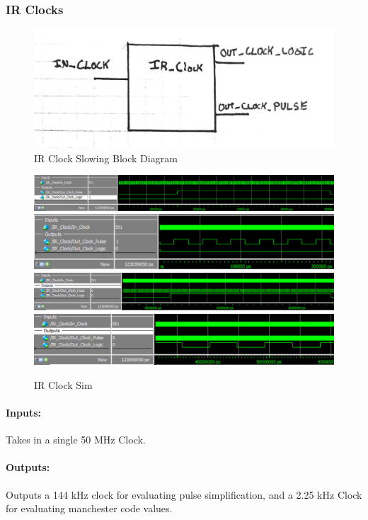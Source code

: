 \documentclass[]{article}
\begin{document}
\subsubsection{IR Clocks}
\label{irclocks}
\begin{figure}[H]\centering
    \includegraphics[width=0.9\linewidth]{figures/IR_Clock_Block.jpg}
    \caption{IR Clock Slowing Block Diagram}
    \label{fig:irClockBlock}
\end{figure}
\begin{figure}[H]\centering
    \includegraphics[width=\linewidth]{figures/IR_Clock_Sim1}
    \includegraphics[width=\linewidth]{figures/IR_Clock_Sim2}
    \includegraphics[width=\linewidth]{figures/IR_Clock_Sim3}
    \includegraphics[width=\linewidth]{figures/IR_Clock_Sim4}
    \caption{IR Clock Sim}
    \label{fig:asyncIRData}
\end{figure}
\paragraph{Inputs:} Takes in a single 50 MHz Clock.
\paragraph{Outputs:} Outputs a 144 kHz clock for evaluating pulse simplification, and a 2.25 kHz Clock for evaluating manchester code values.
\end{document}
